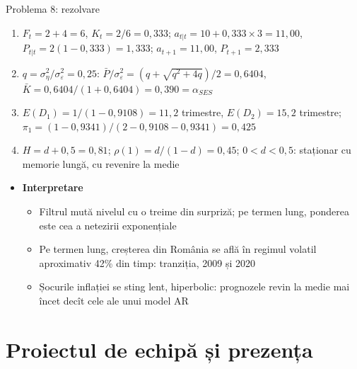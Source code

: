 \begin{frame}{Problema 8: rezolvare}
\itemsize{\footnotesize}
\begin{enumerate}
    \item $F_t = 2 + 4 = 6$, $K_t = 2/6 = 0{,}333$; $a_{t|t} = 10 + 0{,}333 \times 3 = 11{,}00$, $P_{t|t} = 2(1 - 0{,}333) = 1{,}333$; $a_{t+1} = 11{,}00$, $P_{t+1} = 2{,}333$
    \item $q = \sigma^2_\eta/\sigma^2_\varepsilon = 0{,}25$: $\bar P/\sigma^2_\varepsilon = (q + \sqrt{q^2 + 4q})/2 = 0{,}6404$, $\bar K = 0{,}6404/(1 + 0{,}6404) = 0{,}390 = \alpha_{SES}$
    \item $E(D_1) = 1/(1 - 0{,}9108) = 11{,}2$ trimestre, $E(D_2) = 15{,}2$ trimestre; $\pi_1 = (1 - 0{,}9341)/(2 - 0{,}9108 - 0{,}9341) = 0{,}425$
    \item $H = d + 0{,}5 = 0{,}81$; $\rho(1) = d/(1 - d) = 0{,}45$; $0 < d < 0{,}5$: staționar cu memorie lungă, cu revenire la medie
\end{enumerate}
\begin{itemize}
    \item \textbf{Interpretare}
    \begin{itemize}
        \item Filtrul mută nivelul cu o treime din surpriză; pe termen lung, ponderea este cea a netezirii exponențiale
        \item Pe termen lung, creșterea din România se află în regimul volatil aproximativ 42\% din timp: tranziția, 2009 și 2020
        \item Șocurile inflației se sting lent, hiperbolic: prognozele revin la medie mai încet decît cele ale unui model AR
    \end{itemize}
\end{itemize}
\end{frame}


\section{Proiectul de echipă și prezența}

